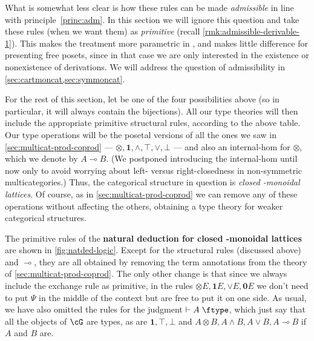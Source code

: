 \documentclass{book}
\let\types\vdash
\def\type{\;\ftype}
\let\meet\wedge
\let\join\vee
\def\joinE{\mathord{\join}E}
\def\zero{\mathbf{0}}
\def\one{\mathbf{1}}
\let\tensor\otimes
\def\tensorE{\mathord{\tensor}E}
\let\hom\multimap
\begin{document}
What is somewhat less clear is how these rules can be made \emph{admissible} in line with principle~\eqref{princ:adm}.
In this section we will ignore this question and take these rules (when we want them) as \emph{primitive} (recall \cref{rmk:admissible-derivable-1}).
This makes the treatment more parametric in \fS, and makes little difference for presenting free posets, since in that case we are only interested in the existence or nonexistence of derivations.
We will address the question of admissibility in \cref{sec:cartmoncat,sec:symmoncat}.

For the rest of this section, let \fS be one of the four possibilities above (so in particular, it will always contain the bijections).
All our type theories will then include the appropriate primitive structural rules, according to the above table.
Our type operations will be the posetal versions of all the ones we saw in \cref{sec:multicat-prod-coprod} --- $\tensor,\one,\meet,\top,\join,\bot$ --- and also an internal-hom for $\tensor$, which we denote by $A\hom B$.
(We postponed introducing the internal-hom until now only to avoid worrying about left- versus right-closedness in non-symmetric multicategories.)
Thus, the categorical structure in question is \emph{closed \fS-monoidal lattices}.
Of course, as in \cref{sec:multicat-prod-coprod} we can remove any of these operations without affecting the others, obtaining a type theory for weaker categorical structures.

The primitive rules of the \textbf{natural deduction for closed \fS-monoidal lattices} are shown in \cref{fig:natded-logic}.
Except for the structural rules (discussed above) and $\hom$, they are all obtained by removing the term annotations from the theory of \cref{sec:multicat-prod-coprod}.
The only other change is that since we always include the exchange rule as primitive, in the rules $\tensorE,\one E,\joinE,\zero E$ we don't need to put $\Psi$ in the middle of the context but are free to put it on one side.
As usual, we have also omitted the rules for the judgment $\types A\type$, which just say that all the objects of $\cG$ are types, as are $\one,\top,\bot$ and $A\tensor B, A\meet B, A\join B, A\hom B$ if $A$ and $B$ are.
\end{document}
